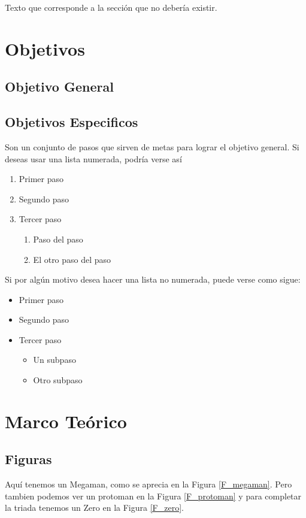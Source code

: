 \documentclass[a4paper]{article}
\begin{document}
Texto que corresponde a la sección que no debería existir.

\newpage
\section{Objetivos}

\subsection{Objetivo General}

\subsection{Objetivos Especificos}

Son un conjunto de pasos que sirven de metas para lograr el 
objetivo general. Si deseas usar una lista numerada, 
podría verse así

\begin{enumerate}
    \item Primer paso
    \item Segundo paso
    \item Tercer paso
    \begin{enumerate}
        \item Paso del paso
        \item El otro paso del paso
    \end{enumerate}
\end{enumerate}

\noindent Si por algún motivo desea hacer una lista 
no numerada, puede verse como sigue:

\begin{itemize}
    \item Primer paso
    \item Segundo paso 
    \item Tercer paso 
    \begin{itemize}
        \item Un subpaso
        \item Otro subpaso
    \end{itemize}
\end{itemize}

\newpage
\section{Marco Teórico}

\subsection{Figuras}
Aquí tenemos un Megaman, como se aprecia en la 
Figura \ref{F_megaman}. Pero tambien podemos ver un 
protoman en la Figura \ref{F_protoman} y para completar 
la triada tenemos un Zero en la Figura \ref{F_zero}. 
\end{document}
